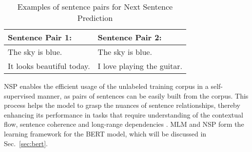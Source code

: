 \begin{table}[htb]
    \centering
    \begin{tabular}{p{} p{}}
        \toprule
        \textbf{Sentence Pair 1:} & \textbf{Sentence Pair 2:} \\
        \midrule
        The sky is blue. & The sky is blue. \\
        It looks beautiful today. & I love playing the guitar. \\
        \bottomrule
    \end{tabular}
    \caption{Examples of sentence pairs for Next Sentence Prediction}
    \label{tab:nsp_examples}
\end{table}

NSP enables the efficient usage of the unlabeled training corpus in a
self-supervised manner, as pairs of sentences can be easily built from the
corpus. This process helps the model to grasp the nuances of sentence
relationships, thereby enhancing its performance in tasks that require
understanding of the contextual flow, sentence coherence and long-range
dependencies \cite{jurafsky2025slp}. MLM and NSP form the learning framework for
the BERT model, which will be discussed in Sec.~\ref{sec:bert}. 

